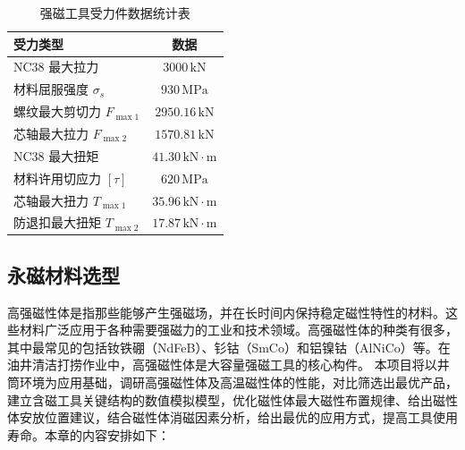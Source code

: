 \begin{table}[htbp]
    \centering
    \caption{强磁工具受力件数据统计表}
    \label{tab:mag_tool_force_data}
    \renewcommand{\arraystretch}{1.5} %
    \begin{tabularx}{.9\textwidth}{Xc}
        \toprule
        受力类型 & 数据 \\
        \midrule
        NC38 最大拉力 & $3000\,\text{kN}$ \\
        材料屈服强度 $\sigma_s$ & $930\,\text{MPa}$ \\
        螺纹最大剪切力 $F_{\max1}$ & $2950.16\,\text{kN}$ \\
        芯轴最大拉力 $F_{\max2}$ & $1570.81\,\text{kN}$ \\
        NC38 最大扭矩 & $41.30\,\text{kN}\cdot\text{m}$ \\
        材料许用切应力 $[\tau]$ & $620\,\text{MPa}$ \\
        芯轴最大扭力 $T_{\max1}$ & $35.96\,\text{kN}\cdot\text{m}$ \\
        防退扣最大扭矩 $T_{\max2}$ & $17.87\,\text{kN}\cdot\text{m}$ \\
        \bottomrule
    \end{tabularx}
\end{table}

































\subsection{永磁材料选型}

高强磁性体是指那些能够产生强磁场，并在长时间内保持稳定磁性特性的材料。这些材料广泛应用于各种需要强磁力的工业和技术领域。高强磁性体的种类有很多，其中最常见的包括钕铁硼（NdFeB）、钐钴（SmCo）和铝镍钴（AlNiCo）等。在油井清洁打捞作业中，高强磁性体是大容量强磁工具的核心构件。
本项目将以井筒环境为应用基础，调研高强磁性体及高温磁性体的性能，对比筛选出最优产品，建立含磁工具关键结构的数值模拟模型，优化磁性体最大磁性布置规律、给出磁性体安放位置建议，结合磁性体消磁因素分析，给出最优的应用方式，提高工具使用寿命。本章的内容安排如下：


